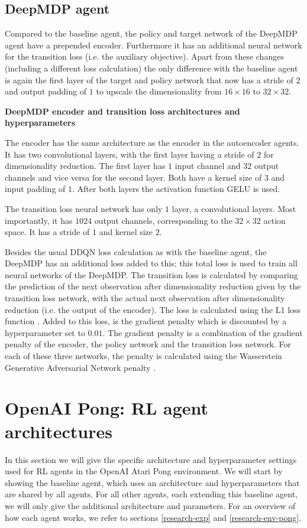 \subsection{DeepMDP agent}
Compared to the baseline agent, the policy and target network of the DeepMDP agent have a prepended encoder. Furthermore it has an additional neural network for the transition loss (i.e. the auxiliary objective). Apart from these changes (including a different loss calculation) the only difference with the baseline agent is again the first layer of the target and policy network that now has a stride of $2$ and output padding of $1$ to upscale the dimensionality from $16 \times 16$ to $32 \times 32$. \par

\noindent \textbf{DeepMDP encoder and transition loss architectures and hyperparameters} \par
\noindent The encoder has the same architecture as the encoder in the autoencoder agents. It has two convolutional layers, with the first layer having a stride of $2$ for dimensionality reduction. The first layer has $1$ input channel and $32$ output channels and vice versa for the second layer. Both have a kernel size of $3$ and input padding of $1$. After both layers the activation function GELU is used.

The transition loss neural network has only $1$ layer, a convolutional layers. Most importantly, it has $1024$ output channels, corresponding to the $32 \times 32$ action space. It has a stride of $1$ and kernel size $2$.

Besides the usual DDQN loss calculation as with the baseline agent, the DeepMDP has an additional loss added to this; this total loss is used to train all neural networks of the DeepMDP. The transition loss is calculated by comparing the prediction of the next observation after dimensionality reduction given by the transition loss network, with the actual next observation after dimensionality reduction (i.e. the output of the encoder). The loss is calculated using the L1 loss function \cite{l1}. Added to this loss, is the gradient penalty which is discounted by a hyperparameter set to $0.01$. The gradient penalty is a combination of the gradient penalty of the encoder, the policy network and the transition loss network. For each of these three networks, the penalty is calculated using the Wasserstein Generative Adversarial Network penalty \cite{wgan}.

\section{OpenAI Pong: RL agent architectures}\label{appendix-agents-pong}
In this section we will give the specific architecture and hyperparameter settings used for RL agents in the OpenAI Atari Pong environment. We will start by showing the baseline agent, which uses an architecture and hyperparameters that are shared by all agents. For all other agents, each extending this baseline agent, we will only give the additional architecture and parameters. For an overview of how each agent works, we refer to sections \ref{research-exp} and \ref{research-env-pong}.


